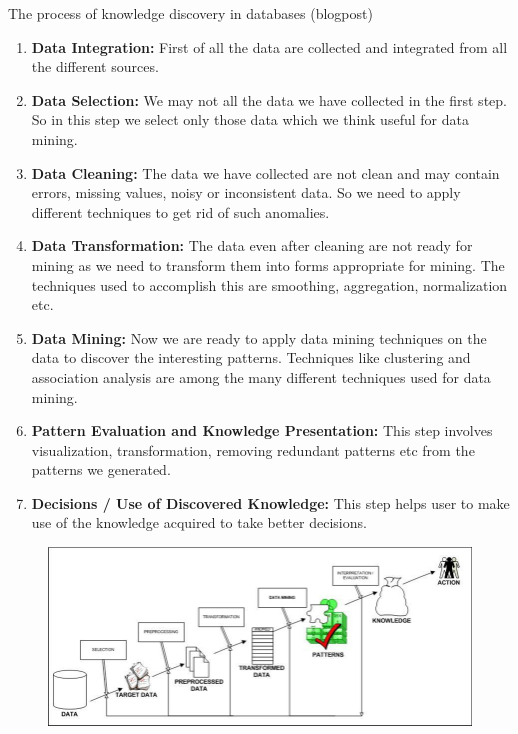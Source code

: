 	\clearpage
	The process of knowledge discovery in databases (blogpost)
		
	\begin{enumerate}
		\item {\bf Data Integration:} First of all the data are collected and integrated from all the 
		different sources.
		\item {\bf Data Selection:} We may not all the data we have collected in the first step. So in this 
		step we select only those data which we think useful for data mining.
		\item {\bf Data Cleaning:} The data we have collected are not clean and may contain errors, missing values,
		noisy or inconsistent data. So we need to apply different techniques to get rid of such anomalies.
		\item {\bf Data Transformation:} The data even after cleaning are not ready for mining as we need to 
		transform them into forms appropriate for mining. The techniques used to accomplish this are smoothing,
		aggregation, normalization etc.
		\item {\bf Data Mining:} Now we are ready to apply data mining techniques on the data to discover the 
		interesting patterns. Techniques like clustering and association analysis are among the many different
		techniques used for data mining.
		\item {\bf Pattern Evaluation and Knowledge Presentation:} This step involves visualization, 
		transformation, removing redundant patterns etc from the patterns we generated.
		\item {\bf Decisions / Use of Discovered Knowledge:} This step helps user to make use of the knowledge acquired to take better decisions.
	\end{enumerate}

		\begin{figure}[H]
			\includegraphics[width=\textwidth]{pics/datamining.jpg}
		\end{figure}

